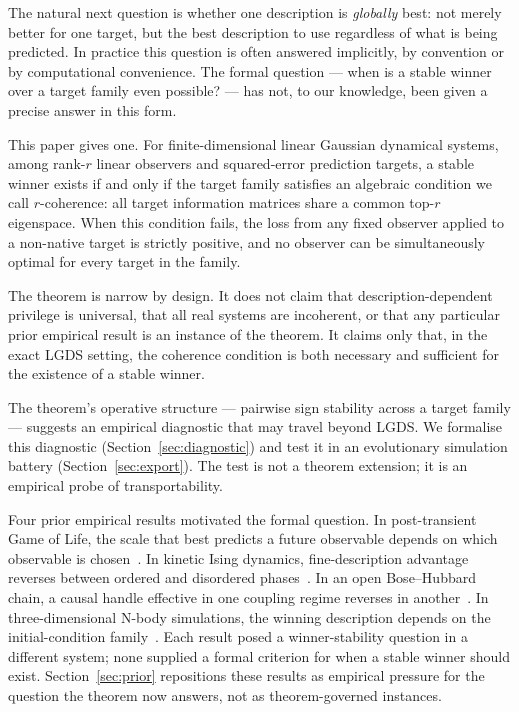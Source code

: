 \documentclass[11pt]{article}
\begin{document}
The natural next question is whether one description is \emph{globally} best:
not merely better for one target, but the best description to use regardless
of what is being predicted.
In practice this question is often answered implicitly, by convention or
by computational convenience.
The formal question --- when is a stable winner over a target family even
possible? --- has not, to our knowledge, been given a precise answer in
this form.

This paper gives one.
For finite-dimensional linear Gaussian dynamical systems, among rank-$r$
linear observers and squared-error prediction targets, a stable winner
exists if and only if the target family satisfies an algebraic condition
we call $r$-coherence: all target information matrices share a common
top-$r$ eigenspace.
When this condition fails, the loss from any fixed observer applied to
a non-native target is strictly positive, and no observer can be
simultaneously optimal for every target in the family.

The theorem is narrow by design.
It does not claim that description-dependent privilege is universal, that
all real systems are incoherent, or that any particular prior empirical
result is an instance of the theorem.
It claims only that, in the exact LGDS setting, the coherence condition
is both necessary and sufficient for the existence of a stable winner.

The theorem's operative structure --- pairwise sign stability across a
target family --- suggests an empirical diagnostic that may travel beyond
LGDS.
We formalise this diagnostic (Section~\ref{sec:diagnostic}) and test it in
an evolutionary simulation battery (Section~\ref{sec:export}).
The test is not a theorem extension; it is an empirical probe of
transportability.

Four prior empirical results motivated the formal question.
In post-transient Game of Life, the scale that best predicts a future
observable depends on which observable is chosen~\citep{bhatia2026ca}.
In kinetic Ising dynamics, fine-description advantage reverses between
ordered and disordered phases~\citep{bhatia2026ising}.
In an open Bose--Hubbard chain, a causal handle effective in one coupling
regime reverses in another~\citep{bhatia2026bh}.
In three-dimensional N-body simulations, the winning description depends
on the initial-condition family~\citep{bhatia2026nbody}.
Each result posed a winner-stability question in a different system;
none supplied a formal criterion for when a stable winner should exist.
Section~\ref{sec:prior} repositions these results as empirical pressure
for the question the theorem now answers, not as theorem-governed instances.
\end{document}
